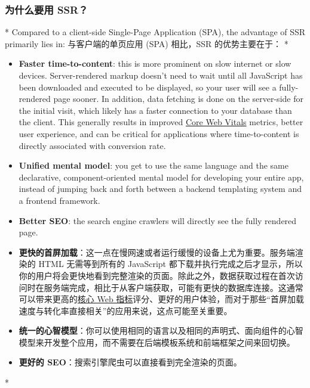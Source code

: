 \begin{paracol}{2}
\subsubsection{为什么要用 SSR？}
\switchcolumn[0]*%
Compared to a client-side Single-Page Application (SPA), the advantage
of SSR primarily lies in:
\switchcolumn
与客户端的单页应用 (SPA) 相比，SSR 的优势主要在于：
\switchcolumn[0]*%
\begin{itemize}
\item
  \textbf{Faster time-to-content}: this is more prominent on slow
  internet or slow devices. Server-rendered markup doesn't need to wait
  until all JavaScript has been downloaded and executed to be displayed,
  so your user will see a fully-rendered page sooner. In addition, data
  fetching is done on the server-side for the initial visit, which
  likely has a faster connection to your database than the client. This
  generally results in improved \href{https://web.dev/vitals/}{Core Web
  Vitals} metrics, better user experience, and can be critical for
  applications where time-to-content is directly associated with
  conversion rate.
\item
  \textbf{Unified mental model}: you get to use the same language and
  the same declarative, component-oriented mental model for developing
  your entire app, instead of jumping back and forth between a backend
  templating system and a frontend framework.
\item
  \textbf{Better SEO}: the search engine crawlers will directly see the
  fully rendered page.
\end{itemize}  
\switchcolumn
\begin{itemize}
\item
  \textbf{更快的首屏加载}：这一点在慢网速或者运行缓慢的设备上尤为重要。服务端渲染的
  HTML 无需等到所有的 JavaScript
  都下载并执行完成之后才显示，所以你的用户将会更快地看到完整渲染的页面。除此之外，数据获取过程在首次访问时在服务端完成，相比于从客户端获取，可能有更快的数据库连接。这通常可以带来更高的\href{https://web.dev/vitals/}{核心
  Web
  指标}评分、更好的用户体验，而对于那些``首屏加载速度与转化率直接相关''的应用来说，这点可能至关重要。
\item
  \textbf{统一的心智模型}：你可以使用相同的语言以及相同的声明式、面向组件的心智模型来开发整个应用，而不需要在后端模板系统和前端框架之间来回切换。
\item
  \textbf{更好的 SEO}：搜索引擎爬虫可以直接看到完全渲染的页面。
\end{itemize}  
  \switchcolumn[0]*%

\end{paracol}
